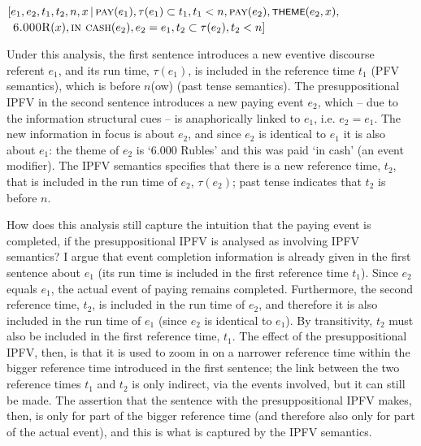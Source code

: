 \documentclass[output=paper,colorlinks,citecolor=brown]{langscibook}
\begin{document}
\ea	\label{ex:zaplatilib}
$[e_1, e_2, t_1, t_2, n, x\,|\,\textsc{pay}(e_1), \tau(e_1) \subset t_1, t_1 < n, \textsc{pay}(e_2), \cnst{theme}(e_2, x),$\\\ $\textsc{6.000R}(x), \textsc{in cash}(e_2), e_2 = e_1, t_2 \subset \tau(e_2), t_2 < n]$
\z 

\noindent Under this analysis, the first sentence introduces a new eventive discourse referent $e_1$, and its run time, $\tau(e_1)$, is included in the reference time $t_1$ (PFV semantics), which is before $n$(ow) (past tense semantics). The presuppositional IPFV in the second sentence introduces a new paying event $e_2$, which -- due to the information structural cues -- is anaphorically linked to $e_1$, i.e. $e_2 = e_1$. The new information in focus is about $e_2$, and since $e_2$ is identical to $e_1$ it is also about $e_1$: the theme of $e_2$ is `6.000 Rubles' and this was paid `in cash' (an event modifier). The IPFV semantics specifies that there is a new reference time, $t_2$, that is included in the run time of $e_2$, $\tau(e_2)$; past tense indicates that $t_2$ is before $n$. 

How does this analysis still capture the intuition that the paying event is completed, if the presuppositional IPFV is analysed as involving IPFV semantics? I argue that event completion information is already given in the first sentence about $e_1$ (its run time is included in the first reference time $t_1$). Since $e_2$ equals $e_1$, the actual event of paying remains completed. Furthermore, the second reference time, $t_2$, is included in the run time of $e_2$, and therefore it is also included in the run time of $e_1$ (since $e_2$ is identical to $e_1$). By transitivity, $t_2$ must also be included in the first reference time, $t_1$. The effect of the presuppositional IPFV, then, is that it is used to zoom in on a narrower reference time within the bigger reference time introduced in the first sentence; the link between the two reference times $t_1$ and $t_2$ is only indirect, via the events involved, but it can still be made. The assertion that the sentence with the presuppositional IPFV makes, then, is only for part of the bigger reference time (and therefore also only for part of the actual event), and this is what is captured by the IPFV semantics. %
\end{document}
